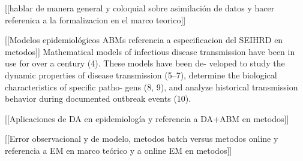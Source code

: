 
[[hablar de manera general y coloquial sobre asimilación de datos y hacer referenica a la formalizacion en el marco teorico]]

[[Modelos epidemiológicos ABMs referencia a especificacion del SEIHRD en metodos]]
Mathematical models of infectious disease transmission have
been in use for over a century (4). These models have been de-
veloped to study the dynamic properties of disease transmission
(5–7), determine the biological characteristics of specific patho-
gens (8, 9), and analyze historical transmission behavior during
documented outbreak events (10).

[[Aplicaciones de DA en epidemiología y referencia a DA+ABM en metodos]]

[[Error observacional y de modelo, metodos batch versus metodos online y referencia a EM en marco teórico y a online EM en metodos]]

